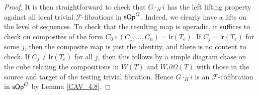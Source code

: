 \documentclass[a4paper,10pt
,draft
]{article}%
\renewcommand{\F}{\mathcal F}
\renewcommand{\1}{\eta}%
\begin{document}
\begin{proof}
{      } %
      It is then straightforward to check that $G \cdot_H i$ has the left lifting property against all local trivial $\F$-fibrations in $\mathsf{sOp}^G$.
      {\color{OliveGreen} %
        Indeed, we clearly have a lifts on the level of sequences.
        To check that the resulting map is operadic, it suffices to check on composites of the form
        $C_0 \circ (C_1, \dots, C_n) = \mathsf{lr}(T_e)$.
        If $C_j = \mathsf{lr}(T_e)$ for some $j$, then the composite map is just the identity, and there is no content to check.
        If $C_j \neq \mathsf{lr}(T_e)$ for all $j$,
        then this follows by a simple diagram chase on the cube relating the compositions in $W(T)$ and $W_! \partial \Omega(T)$ with those in the source and target of the testing trivial fibration.
      } %
      Hence $G \cdot_H i$ is an $\F$-cofibration in $\mathsf{sOp}^G$ by Lemma \ref{CAV_4.8}.
      

\end{proof}
\end{document}
